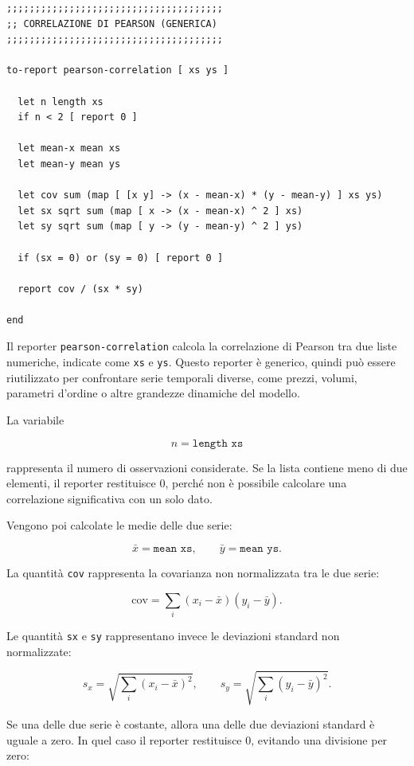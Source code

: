 \begin{lstlisting}[caption={Reporter generico per il calcolo della correlazione di Pearson}]
;;;;;;;;;;;;;;;;;;;;;;;;;;;;;;;;;;;;;;
;; CORRELAZIONE DI PEARSON (GENERICA)
;;;;;;;;;;;;;;;;;;;;;;;;;;;;;;;;;;;;;;

to-report pearson-correlation [ xs ys ]

  let n length xs
  if n < 2 [ report 0 ]

  let mean-x mean xs
  let mean-y mean ys

  let cov sum (map [ [x y] -> (x - mean-x) * (y - mean-y) ] xs ys)
  let sx sqrt sum (map [ x -> (x - mean-x) ^ 2 ] xs)
  let sy sqrt sum (map [ y -> (y - mean-y) ^ 2 ] ys)

  if (sx = 0) or (sy = 0) [ report 0 ]

  report cov / (sx * sy)

end
\end{lstlisting}

Il reporter \texttt{pearson-correlation} calcola la correlazione di Pearson tra
due liste numeriche, indicate come \texttt{xs} e \texttt{ys}. Questo reporter è
generico, quindi può essere riutilizzato per confrontare serie temporali diverse,
come prezzi, volumi, parametri d'ordine o altre grandezze dinamiche del modello.

La variabile

\[
n = \texttt{length xs}
\]

rappresenta il numero di osservazioni considerate. Se la lista contiene meno di
due elementi, il reporter restituisce \(0\), perché non è possibile calcolare una
correlazione significativa con un solo dato.

Vengono poi calcolate le medie delle due serie:

\[
\bar{x} = \texttt{mean xs},
\qquad
\bar{y} = \texttt{mean ys}.
\]

La quantità \texttt{cov} rappresenta la covarianza non normalizzata tra le due
serie:

\[
\text{cov}
=
\sum_i
(x_i-\bar{x})(y_i-\bar{y}).
\]

Le quantità \texttt{sx} e \texttt{sy} rappresentano invece le deviazioni standard
non normalizzate:

\[
s_x =
\sqrt{
\sum_i (x_i-\bar{x})^2
},
\qquad
s_y =
\sqrt{
\sum_i (y_i-\bar{y})^2
}.
\]

Se una delle due serie è costante, allora una delle due deviazioni standard è
uguale a zero. In quel caso il reporter restituisce \(0\), evitando una divisione
per zero:

